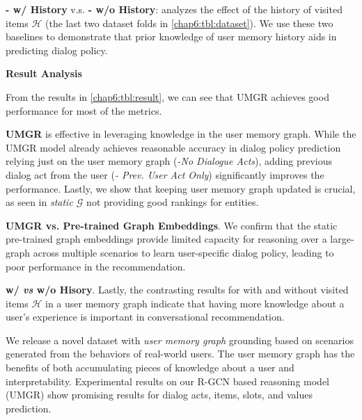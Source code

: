 \noindent \textbf{- w/ History} v.s. \textbf{- w/o History}: analyzes the effect of the history of visited items $\mathcal{H}$ (the last two dataset folds in \ref{chap6:tbl:dataset}). We use these two baselines to demonstrate that prior knowledge of user memory history aids in predicting dialog policy.


\textbf{Result Analysis}

From the results in \ref{chap6:tbl:result}, we can see that UMGR achieves good performance for most of the metrics.

\noindent \textbf{UMGR} is effective in leveraging knowledge in the user memory graph.
While the UMGR model already achieves reasonable accuracy in dialog policy prediction relying just on the user memory graph (\textit{-No Dialogue Acts}),
adding previous dialog act from the user (\textit{- Prev. User Act Only}) significantly improves the performance.
Lastly, we show that keeping user memory graph updated is crucial, as seen in \textit{static $\mathcal{G}$} not providing good rankings for entities.  

\noindent \textbf{UMGR vs. Pre-trained Graph Embeddings}. We confirm that the static pre-trained graph embeddings provide limited capacity for reasoning over a large-graph across multiple scenarios to learn user-specific dialog policy, leading to poor performance in the recommendation.

\noindent \textbf{w/ \textit{vs} w/o Hisory}. Lastly, the contrasting results for with and without visited items $\mathcal{H}$ in a user memory graph indicate that having more knowledge about a user's experience is important in conversational recommendation.

We release a novel dataset with \textit{user memory graph} grounding based on scenarios generated from the behaviors of real-world users.
The user memory graph has the benefits of both accumulating pieces of knowledge about a user and interpretability.
Experimental results on our R-GCN based reasoning model (UMGR) show promising results for dialog acts, items, slots, and values prediction.

